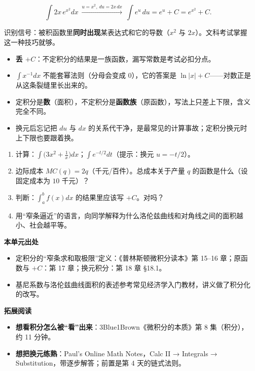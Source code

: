 \documentclass[UTF8,a4paper,11pt]{ctexart}
\begin{document}
\[
  \int 2x\,e^{x^{2}}dx\ \xrightarrow{u=x^{2},\ du=2x\,dx}\ \int e^{u}\,du=e^{u}+C=e^{x^{2}}+C .
\]

识别信号：被积函数里\textbf{同时出现}某表达式和它的导数（$x^2$ 与 $2x$）。文科考试掌握这一种技巧就够。

\begin{calcbox}[易错点与失效边界]
\begin{itemize}
  \item \textbf{丢 $+C$}：不定积分的结果是一族函数，漏写常数是考试必扣分点。
  \item $\int x^{-1}dx$ 不能套幂法则（分母会变成 $0$），它的答案是 $\ln|x|+C$——对数正是从这条裂缝里长出来的。
  \item 定积分是\textbf{数}（面积），不定积分是\textbf{函数族}（原函数），写法上只差上下限，含义完全不同。
  \item 换元后忘记把 $du$ 与 $dx$ 的关系代干净，是最常见的计算事故；定积分换元时上下限也要跟着换。
\end{itemize}
\end{calcbox}

\begin{exercise}[今日自测]
\begin{enumerate}
  \item 计算：$\displaystyle\int\bigl(3x^2+\tfrac{1}{x}\bigr)dx$；$\displaystyle\int e^{-t/2}dt$（提示：换元 $u=-t/2$）。
  \item 边际成本 $MC(q)=2q$（千元/百件）。总成本关于产量 $q$ 的函数是什么（设固定成本为 $10$ 千元）？
  \item 判断：$\displaystyle\int_a^b f(x)dx$ 的结果里应该写 $+C$。对吗？
  \item 用“窄条逼近”的语言，向同学解释为什么洛伦兹曲线和对角线之间的面积越小、社会越平等。
\end{enumerate}
\end{exercise}

\begin{reading}
\textbf{本单元出处}
\begin{itemize}
  \item 定积分的“窄条求和取极限”定义：《普林斯顿微积分读本》第 15–16 章；原函数与 $+C$：第 17 章；换元积分：第 18 章 §18.1。
  \item 基尼系数与洛伦兹曲线面积的表述参考常见经济学入门教材，讲义做了积分化的改写。
\end{itemize}
\textbf{拓展阅读}
\begin{itemize}
  \item \textbf{想看积分怎么被“看”出来}：3Blue1Brown《微积分的本质》第 8 集（积分），约 11 分钟。
  \item \textbf{想把换元练熟}：Paul's Online Math Notes，Calc II → Integrals → Substitution，带逐步解答；前置是第 4 天的链式法则。
\end{itemize}
\end{reading}
\end{document}
